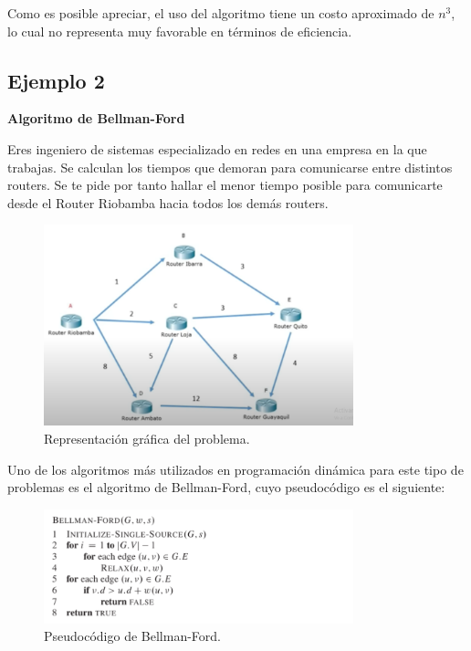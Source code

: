 Como es posible apreciar, el uso del algoritmo tiene un costo aproximado de $n^3$, lo cual no representa muy favorable en términos de eficiencia.

\subsection{Ejemplo 2}
\textbf{Algoritmo de Bellman-Ford}

Eres ingeniero de sistemas especializado en redes en una empresa en la que trabajas. Se calculan los tiempos que demoran para comunicarse entre distintos routers. Se te pide por tanto hallar el menor tiempo posible para comunicarte desde el Router Riobamba hacia todos los demás routers. 

\begin{figure}[H]
	\centering
	\includegraphics[width=0.8\textwidth]{distancias_cortas_RepresentacionG1_ejem2.png}
	\caption{Representación gráfica del problema.}
	\label{fig:resultado}
\end{figure}


Uno de los algoritmos más utilizados en programación dinámica para este tipo de problemas es el algoritmo de Bellman-Ford, cuyo pseudocódigo es el siguiente:

\begin{figure}[H]
	\centering
	\includegraphics[width=0.8\textwidth]{distancias_cortas_Pseudo2.png}
	\caption{Pseudocódigo de Bellman-Ford.}
	\label{fig:resultado}
\end{figure}

